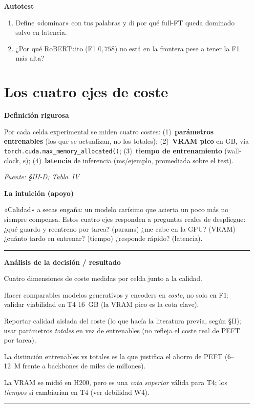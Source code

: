 \documentclass[11pt,a4paper]{article}
\newcommand{\nivel}[1]{\medskip\noindent\textbf{\textcolor{blue!45!black}{#1}}\par\nopagebreak\smallskip}
\newcommand{\fuente}[1]{\nopagebreak\par\hfill{\footnotesize\textit{Fuente: #1}}\par}
\newenvironment{analisis}{%
  \medskip\par\noindent\rule{\linewidth}{0.4pt}\par\nopagebreak
  \textbf{Análisis de la decisión / resultado}\par\nopagebreak\smallskip
  \begin{description}[leftmargin=2.6cm,style=nextline,font=\bfseries]
}{%
  \end{description}\noindent\rule{\linewidth}{0.4pt}\par\medskip
}
\begin{document}
\nivel{Autotest}
\begin{enumerate}[nosep]
  \item Define «dominar» con tus palabras y di por qué full-FT queda dominado salvo en latencia.
  \item ¿Por qué RoBERTuito (F1 $0{,}758$) no está en la frontera pese a tener la F1 más alta?
\end{enumerate}

\section{Los cuatro ejes de coste}\label{sec:costaxes}

\nivel{Definición rigurosa}
Por cada celda experimental se miden cuatro costes: (1)~\textbf{parámetros entrenables} (los que se
actualizan, no los totales); (2)~\textbf{VRAM pico} en GB, vía
\texttt{torch.cuda.max\_memory\_allocated()}; (3)~\textbf{tiempo de entrenamiento} (wall-clock, s);
(4)~\textbf{latencia} de inferencia (ms/ejemplo, promediada sobre el test).
\fuente{\S III-D; Tabla~IV}

\nivel{La intuición (apoyo)}
«Calidad» a secas engaña: un modelo carísimo que acierta un poco más no siempre compensa. Estos
cuatro ejes responden a preguntas reales de despliegue: ¿qué guardo y reentreno por tarea? (params)
¿me cabe en la GPU? (VRAM) ¿cuánto tardo en entrenar? (tiempo) ¿responde rápido? (latencia).

\begin{analisis}
  \item[Qué] Cuatro dimensiones de coste medidas por celda junto a la calidad.
  \item[Por qué] Hacer comparables modelos generativos y encoders en \emph{coste}, no solo en F1;
        validar viabilidad en T4 16~GB (la VRAM pico es la cota clave).
  \item[Alternativas descartadas] Reportar calidad aislada del coste (lo que hacía la literatura
        previa, según \S II); usar parámetros \emph{totales} en vez de entrenables (no refleja el
        coste real de PEFT por tarea).
  \item[Qué significa] La distinción entrenables vs totales es la que justifica el ahorro de PEFT
        (6--12~M frente a backbones de miles de millones).
  \item[Qué NO significa] La VRAM se midió en H200, pero es una \emph{cota superior} válida para T4;
        los \emph{tiempos} sí cambiarían en T4 (ver debilidad W4).
\end{analisis}
\end{document}
